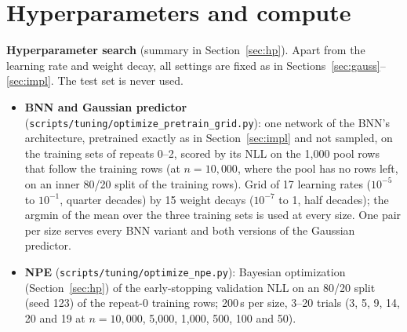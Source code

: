 \documentclass[11pt]{article}
\newcommand{\code}[1]{\texttt{#1}}
\begin{document}
\section{Hyperparameters and compute}
\label{app:hp}
\textbf{Hyperparameter search} (summary in Section~\ref{sec:hp}). Apart from the learning rate and weight decay, all
settings are fixed as in Sections~\ref{sec:gauss}--\ref{sec:impl}. The test set is never used.
\begin{itemize}
\item \textbf{BNN and Gaussian predictor} (\code{scripts/tuning/optimize\_pretrain\_grid.py}): one network of the BNN's
  architecture, pretrained exactly as in Section~\ref{sec:impl} and not sampled, on the training sets of repeats 0--2,
  scored by its NLL on the 1{,}000 pool rows that follow the training rows (at $n=10{,}000$, where the pool has no rows
  left, on an inner 80/20 split of the training rows). Grid of 17 learning rates ($10^{-5}$ to $10^{-1}$, quarter decades)
  by 15 weight decays ($10^{-7}$ to 1, half decades); the argmin of the mean over the three training sets is used at
  every size. One pair per size serves every BNN variant and both versions of the Gaussian predictor.
\item \textbf{NPE} (\code{scripts/tuning/optimize\_npe.py}): Bayesian optimization (Section~\ref{sec:hp}) of the early-stopping
  validation NLL on an 80/20 split (seed 123) of the repeat-0 training rows; 200\,s per size, 3--20 trials (3, 5, 9,
  14, 20 and 19 at $n=10{,}000$, 5{,}000, 1{,}000, 500, 100 and 50).
\end{itemize}
\end{document}
